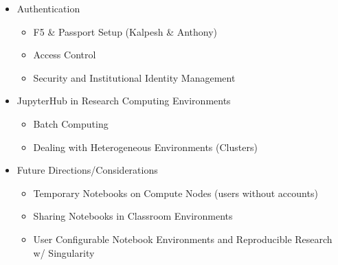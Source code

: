 \documentclass[12pt]{article}
\begin{document}
\maketitle

\begin{abstract}

\end{abstract}

\begin{itemize}
    \item Authentication
    \begin{itemize}
        \item F5 \& Passport Setup (Kalpesh \& Anthony)
        \item Access Control
        \item Security and Institutional Identity Management
    \end{itemize}
    \item JupyterHub in Research Computing Environments
    \begin{itemize}
        \item Batch Computing
        \item Dealing with Heterogeneous Environments (Clusters)
    \end{itemize}
    \item Future Directions/Considerations
    \begin{itemize}
        \item Temporary Notebooks on Compute Nodes (users without accounts)
        \item Sharing Notebooks in Classroom Environments
        \item User Configurable Notebook Environments and Reproducible Research w/ Singularity
    \end{itemize}
\end{itemize}

\newpage
\end{document}

